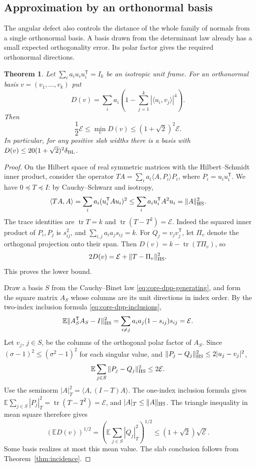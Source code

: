 \documentclass[11pt,a4paper]{article}
\newtheorem{theorem}{Theorem}[section]
\theoremstyle{remark}\newtheorem{remark}[theorem]{Remark}
\numberwithin{equation}{section}
\begin{document}
\subsection{Approximation by an orthonormal basis}
\label{sec:axes}

The angular defect also controls the distance of the whole family of
normals from a single orthonormal basis. A basis drawn from the
determinant law already has a small expected orthogonality error.
Its polar factor gives the required orthonormal directions.

\begin{theorem}\label{thm:orthogonal-directions}
Let \(\sum_i a_i u_i u_i^{\mathsf T}=I_k\) be an isotropic unit frame.
For an orthonormal basis \(v=(v_1,\ldots,v_k)\) put
\[
 D(v)=\sum_i a_i\left(1-\sum_{j=1}^k|\langle u_i,v_j\rangle|^4\right).
\]
Then
\[
 \frac12\mathcal E\le\min_v D(v)\le(1+\sqrt2)^2\mathcal E .
\]
In particular, for any positive slab widths there is a basis with
\(D(v)\le20(1+\sqrt2)^2\delta_{\rm BL}\).
\end{theorem}
\begin{proof}
On the Hilbert space of real symmetric matrices with the
Hilbert--Schmidt inner product, consider the operator
\(T A=\sum_i a_i\langle A,P_i\rangle P_i\),
where \(P_i=u_i u_i^{\mathsf T}\). We have \(0\preceq T\preceq I\):
by Cauchy--Schwarz and isotropy,
\[
 \langle TA,A\rangle=\sum_i a_i(u_i^{\mathsf T}Au_i)^2
 \le\sum_i a_i u_i^{\mathsf T}A^2u_i=\|A\|_{\rm HS}^2 .
\]
The trace identities are \(\operatorname{tr}T=k\) and
\(\operatorname{tr}(T-T^2)=\mathcal E\). Indeed the squared inner
product of \(P_i,P_j\) is \(s_{ij}^2\), and
\(\sum_{i,j}a_i a_js_{ij}=k\).
For \(Q_j=v_jv_j^{\mathsf T}\), let \(\Pi_v\) denote the orthogonal
projection onto their span. Then
\(D(v)=k-\operatorname{tr}(T\Pi_v)\), so
\[
 2D(v)=\mathcal E+\|T-\Pi_v\|_{\rm HS}^2 .
\]
This proves the lower bound.

Draw a basis \(S\) from the Cauchy--Binet law
\eqref{eq:core-dpp-generating}, and form the square matrix \(A_S\)
whose columns are its unit directions in index order. By the two-index
inclusion formula \eqref{eq:core-dpp-inclusions},
\[
 \mathbb E\|A_S^{\mathsf T}A_S-I\|_{\rm HS}^2
 =\sum_{i\ne j}a_i a_j(1-s_{ij})s_{ij}=\mathcal E .
\]
Let \(v_j\), \(j\in S\), be the columns of the orthogonal polar factor
of \(A_S\). Since \((\sigma-1)^2\le(\sigma^2-1)^2\) for each singular
value, and
\(\|P_j-Q_j\|_{\rm HS}^2\le2|u_j-v_j|^2\),
\[
 \mathbb E\sum_{j\in S}\|P_j-Q_j\|_{\rm HS}^2\le2\mathcal E .
\]
Use the seminorm \(|A|_T^2=\langle A,(I-T)A\rangle\).
The one-index inclusion formula gives
\(\mathbb E\sum_{j\in S}|P_j|_T^2=\operatorname{tr}(T-T^2)=\mathcal E\),
and \(|A|_T\le\|A\|_{\rm HS}\). The triangle inequality in mean square
therefore gives
\[
 (\mathbb E D(v))^{1/2}
 =\left(\mathbb E\sum_{j\in S}|Q_j|_T^2\right)^{1/2}
 \le(1+\sqrt2)\sqrt{\mathcal E}.
\]
Some basis realizes at most this mean value. The slab conclusion
follows from Theorem~\ref{thm:incidence}.
\end{proof}
\end{document}
